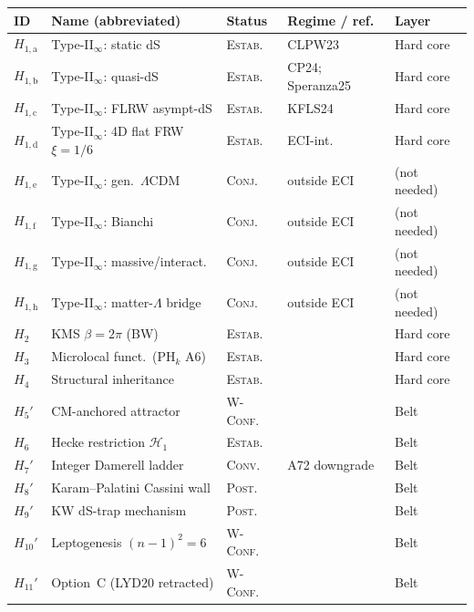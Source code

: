 \documentclass[a4paper,11pt]{article}
\theoremstyle{definition}
\theoremstyle{remark}
\begin{document}
\begin{table}[ht]
\centering
\small
\setlength{\tabcolsep}{3.5pt}
\begin{tabular}{lllll}
\toprule
ID & Name (abbreviated) & Status & Regime / ref. & Layer \\
\midrule
$H_{1,\mathrm{a}}$ & Type-II$_\infty$: static dS
  & \textsc{Estab.} & CLPW23 \cite{CLPW23} & Hard core \\
$H_{1,\mathrm{b}}$ & Type-II$_\infty$: quasi-dS
  & \textsc{Estab.} & CP24; Speranza25 & Hard core \\
$H_{1,\mathrm{c}}$ & Type-II$_\infty$: FLRW asympt-dS
  & \textsc{Estab.} & KFLS24 \cite{KFLS24} & Hard core \\
$H_{1,\mathrm{d}}$ & Type-II$_\infty$: 4D flat FRW $\xi{=}1/6$
  & \textsc{Estab.} & ECI-int.\ \cite{FRWnote} & Hard core \\
$H_{1,\mathrm{e}}$ & Type-II$_\infty$: gen.\ $\Lambda$CDM
  & \textsc{Conj.} & outside ECI & (not needed) \\
$H_{1,\mathrm{f}}$ & Type-II$_\infty$: Bianchi
  & \textsc{Conj.} & outside ECI & (not needed) \\
$H_{1,\mathrm{g}}$ & Type-II$_\infty$: massive/interact.
  & \textsc{Conj.} & outside ECI & (not needed) \\
$H_{1,\mathrm{h}}$ & Type-II$_\infty$: matter-$\Lambda$ bridge
  & \textsc{Conj.} & outside ECI & (not needed) \\
\midrule
$H_2$ & KMS $\beta{=}2\pi$ (BW) & \textsc{Estab.} & & Hard core \\
$H_3$ & Microlocal funct.\ (PH$_k$ A6) & \textsc{Estab.} & & Hard core \\
$H_4$ & Structural inheritance & \textsc{Estab.} & & Hard core \\
$H_5'$ & CM-anchored attractor & \textsc{W-Conf.} & & Belt \\
$H_6$ & Hecke restriction $\mathcal{H}_1$ & \textsc{Estab.} & & Belt \\
$H_7'$ & Integer Damerell ladder & \textsc{Conv.} & A72 downgrade & Belt \\
$H_8'$ & Karam--Palatini Cassini wall & \textsc{Post.} & & Belt \\
$H_9'$ & KW dS-trap mechanism & \textsc{Post.} & & Belt \\
$H_{10}'$ & Leptogenesis $(n{-}1)^2{=}6$ & \textsc{W-Conf.} & & Belt \\
$H_{11}'$ & Option~C (LYD20 retracted) & \textsc{W-Conf.} & & Belt \\
\bottomrule
\end{tabular}

\end{table}
\end{document}
